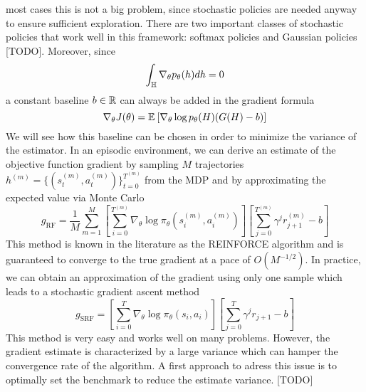 most cases this is not a big problem, since stochastic policies are needed
anyway to ensure sufficient exploration. There are two important classes of
stochastic policies that work well in this framework: softmax policies and
Gaussian policies [TODO]. 
Moreover, since
\begin{equation*}
	\int_{\mathbb{H}} \nabla_\theta p_\theta(h) dh = 0	
\end{equation*}
a constant baseline $b \in \mathbb{R}$ can always be added in the gradient formula
\begin{equation}
	\nabla_\theta J(\theta) = \mathbb{E}_{}\left[ \nabla_\theta \log p_\theta(H)(G(H)-b) \right]
\end{equation}
We will see how this baseline can be chosen in order to minimize the variance
of the estimator. In an episodic environment, we can derive an estimate of the 
objective function gradient by sampling $M$ trajectories $h^{(m)} = \{(s_t^{(m)},
a_t^{(m)})\}_{t = 0}^{T^{(m)}}$ from the MDP and by approximating the expected 
value via Monte Carlo
\begin{equation}
	g_{\text{RF}} = \frac{1}{M} \sum^{M}_{m=1} \left[ \sum_{i=0}^{T^{(m)}} 
	\nabla_\theta \log \pi_\theta(s_i^{(m)}, a_i^{(m)}) \right] \left[
	\sum^{T^{(m)}}_{j=0} \gamma^j r_{j+1}^{(m)} - b \right]  
\end{equation}
This method is known in the literature as the REINFORCE algorithm and is
guaranteed to converge to the true gradient at a pace of $O(M^{-1/2})$. In
practice, we can obtain an approximation of the gradient using only one sample
which leads to a stochastic gradient ascent method
\begin{equation}
	g_{\text{SRF}} = \left[ \sum_{i=0}^{T} \nabla_\theta \log \pi_\theta(s_i, 
	a_i) \right] \left[ \sum^{T}_{j=0} \gamma^j r_{j+1} - b \right]  
\end{equation}
This method is very easy and works well on many problems. However, the gradient
estimate is characterized by a large variance which can hamper the convergence
rate of the algorithm. A first approach to adress this issue is to optimally
set the benchmark to reduce the estimate variance. [TODO]

